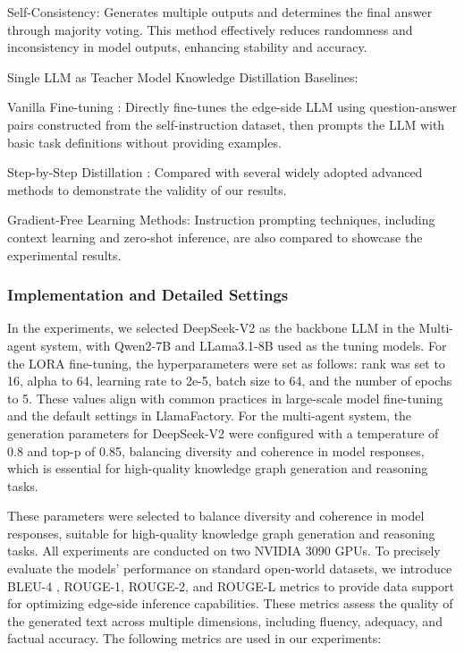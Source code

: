 \documentclass[preprint,12pt]{elsarticle}
\def\textbf#1{#1}%
\begin{document}
\textbf{Self-Consistency:} Generates multiple outputs and determines the final answer through majority voting. This method effectively reduces randomness and inconsistency in model outputs, enhancing stability and accuracy.
  
\textbf{Single LLM as Teacher Model Knowledge Distillation Baselines:}

\textbf{Vanilla Fine-tuning \cite{Yao2023b}:} Directly fine-tunes  the edge-side LLM using question-answer pairs constructed from the self-instruction dataset, then prompts the LLM with basic task definitions without providing examples.
   
\textbf{Step-by-Step Distillation \cite{Hsieh2023}:} Compared with several widely adopted advanced methods to demonstrate the validity of our results.
    
\textbf{Gradient-Free Learning Methods:} Instruction prompting techniques, including context learning and zero-shot inference, are also compared to showcase the experimental results.



\subsubsection{Implementation and Detailed Settings}
In the experiments, we selected DeepSeek-V2 \cite{Liu2024b} as the backbone LLM in the Multi-agent system, with Qwen2-7B \cite{Yang2024BB} and LLama3.1-8B \cite{Deroy2024} used as the tuning models. For the LORA fine-tuning, the hyperparameters were set as follows: rank was set to 16, alpha to 64, learning rate to 2e-5, batch size to 64, and the number of epochs to 5. These values align with common practices in large-scale model fine-tuning and the default settings in LlamaFactory. For the multi-agent system, the generation parameters for DeepSeek-V2 were configured with a temperature of 0.8 and top-p of 0.85, balancing diversity and coherence in model responses, which is essential for high-quality knowledge graph generation and reasoning tasks.

These parameters were selected to balance diversity and coherence in model responses, suitable for high-quality knowledge graph generation and reasoning tasks.
All experiments are conducted on two NVIDIA 3090 GPUs. To precisely evaluate the models' performance on standard open-world datasets, we introduce BLEU-4 \cite{Papineni2002}, ROUGE-1, ROUGE-2, and ROUGE-L \cite{Lin2003} metrics to provide data support for optimizing edge-side inference capabilities. These metrics assess the quality of the generated text across multiple dimensions, including fluency, adequacy, and factual accuracy. The following metrics are used in our experiments: 
\end{document}
